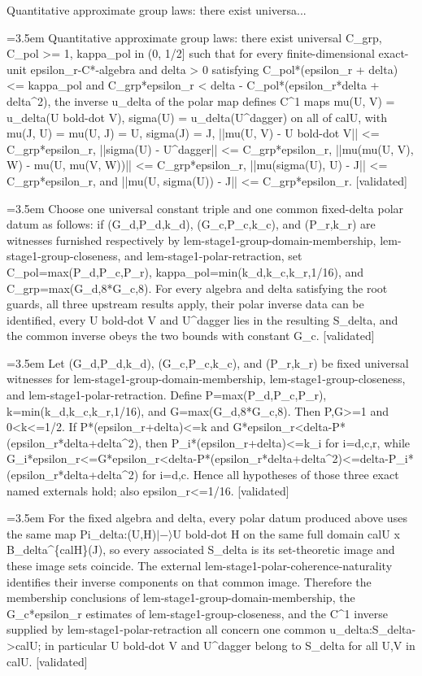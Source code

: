 \documentclass{article}
\newcommand{\step}[1]{\par\noindent\hangindent=3.5em\hangafter=1%
  \makebox[3.5em][l]{\textbf{#1.}}}
\newcommand{\steptag}[1]{\hfill{\small\textsf{[#1]}}}
\begin{document}
\begin{proofbox}{Quantitative approximate group laws: there exist universa...}
\step{1} Quantitative approximate group laws: there exist universal C\_grp, C\_pol >= 1, kappa\_pol in (0, 1/2] such that for every finite-dimensional exact-unit epsilon\_r-C*-algebra and delta > 0 satisfying C\_pol*(epsilon\_r + delta) <= kappa\_pol and C\_grp*epsilon\_r < delta - C\_pol*(epsilon\_r*delta + delta\textasciicircum{}2), the inverse u\_delta of the polar map defines C\textasciicircum{}1 maps mu(U, V) = u\_delta(U bold-dot V), sigma(U) = u\_delta(U\textasciicircum{}dagger) on all of calU, with mu(J, U) = mu(U, J) = U, sigma(J) = J, ||mu(U, V) - U bold-dot V|| <= C\_grp*epsilon\_r, ||sigma(U) - U\textasciicircum{}dagger|| <= C\_grp*epsilon\_r, ||mu(mu(U, V), W) - mu(U, mu(V, W))|| <= C\_grp*epsilon\_r, ||mu(sigma(U), U) - J|| <= C\_grp*epsilon\_r, and ||mu(U, sigma(U)) - J|| <= C\_grp*epsilon\_r. \steptag{validated} \\[6pt]
\step{1.1} Choose one universal constant triple and one common fixed-delta polar datum as follows: if (G\_d,P\_d,k\_d), (G\_c,P\_c,k\_c), and (P\_r,k\_r) are witnesses furnished respectively by lem-stage1-group-domain-membership, lem-stage1-group-closeness, and lem-stage1-polar-retraction, set C\_pol=max(P\_d,P\_c,P\_r), kappa\_pol=min(k\_d,k\_c,k\_r,1/16), and C\_grp=max(G\_d,8*G\_c,8). For every algebra and delta satisfying the root guards, all three upstream results apply, their polar inverse data can be identified, every U bold-dot V and U\textasciicircum{}dagger lies in the resulting S\_delta, and the common inverse obeys the two bounds with constant G\_c. \steptag{validated} \\[6pt]
\step{1.1.1} Let (G\_d,P\_d,k\_d), (G\_c,P\_c,k\_c), and (P\_r,k\_r) be fixed universal witnesses for lem-stage1-group-domain-membership, lem-stage1-group-closeness, and lem-stage1-polar-retraction. Define P=max(P\_d,P\_c,P\_r), k=min(k\_d,k\_c,k\_r,1/16), and G=max(G\_d,8*G\_c,8). Then P,G>=1 and 0<k<=1/2. If P*(epsilon\_r+delta)<=k and G*epsilon\_r<delta-P*(epsilon\_r*delta+delta\textasciicircum{}2), then P\_i*(epsilon\_r+delta)<=k\_i for i=d,c,r, while G\_i*epsilon\_r<=G*epsilon\_r<delta-P*(epsilon\_r*delta+delta\textasciicircum{}2)<=delta-P\_i*(epsilon\_r*delta+delta\textasciicircum{}2) for i=d,c. Hence all hypotheses of those three exact named externals hold; also epsilon\_r<=1/16. \steptag{validated} \\[4pt]
\step{1.1.2} For the fixed algebra and delta, every polar datum produced above uses the same map Pi\_delta:(U,H)$|-\rangle$U bold-dot H on the same full domain calU x B\_delta\textasciicircum{}\{calH\}(J), so every associated S\_delta is its set-theoretic image and these image sets coincide. The external lem-stage1-polar-coherence-naturality identifies their inverse components on that common image. Therefore the membership conclusions of lem-stage1-group-domain-membership, the G\_c*epsilon\_r estimates of lem-stage1-group-closeness, and the C\textasciicircum{}1 inverse supplied by lem-stage1-polar-retraction all concern one common u\_delta:S\_delta->calU; in particular U bold-dot V and U\textasciicircum{}dagger belong to S\_delta for all U,V in calU. \steptag{validated} \\[4pt]

\end{proofbox}
\end{document}
